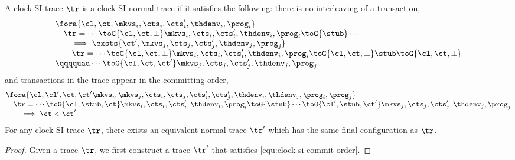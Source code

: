 \begin{theorem}

A clock-SI trace \( \tr \) is a clock-SI normal trace if it satisfies the following:
there is no interleaving of a transaction,
\begin{equation}
    \label{equ:clock-si-no-interleaving}
    \begin{array}{@{}l@{}}
        \fora{\cl,\ct, \mkvs_i, \cts_i, \cts'_i, \thdenv_i, \prog_i} \\
        \quad \tr = \cdots \toG{\cl,\ct,\perp} \mkvs_i, \cts_i, \cts'_i, \thdenv_i, \prog_i \toG{\stub} \cdots \\
        \qquad \implies \exsts{\ct', \mkvs_j, \cts_j, \cts'_j, \thdenv_j, \prog_j} \\
        \qquad \tr = \cdots \toG{\cl,\ct,\perp} \mkvs_i, \cts_i, \cts'_i, \thdenv_i, \prog_i \toG{\cl,\ct,\perp} \stub \toG{\cl,\ct,\perp} \\
        \qqqquad \cdots \toG{\cl,\ct,\ct'} \mkvs_j, \cts_j, \cts'_j, \thdenv_j, \prog_j
    \end{array}
\end{equation}
and transactions in the trace appear in the committing order, 
\begin{equation}
    \label{equ:clock-si-commit-order}
    \begin{array}{@{}l@{}}
        \fora{\cl,\cl',\ct, \ct' \mkvs_i, \mkvs_j, \cts_i, \cts_j, \cts'_i, \cts'_j, \thdenv_i, \thdenv_j,  \prog_i, \prog_j} \\
        \quad \tr = \cdots \toG{\cl,\stub,\ct} \mkvs_i, \cts_i, \cts'_i, \thdenv_i, \prog_i \toG{\stub}  \cdots \toG{\cl',\stub,\ct'} \mkvs_j, \cts_j, \cts'_j, \thdenv_j, \prog_j \\
        \qquad \implies \ct < \ct'
    \end{array}
\end{equation}
For any clock-SI trace \( \tr \), there exists an equivalent normal trace \( \tr' \) which has the same final configuration as \( \tr \).
\end{theorem}
\begin{proof}
    Given a trace \( \tr \), we first construct a trace \( \tr' \)  that satisfies \cref{equ:clock-si-commit-order}.
\end{proof}
